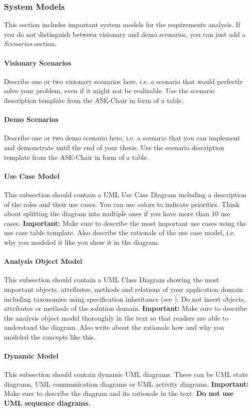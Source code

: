 	\subsubsection{System Models}
		This section includes important system models for the requirements analysis.
		If you do not distinguish between visionary and demo scenarios, you can just add a \textit{Scenarios} section.
		\paragraph{Visionary Scenarios}
			Describe one or two visionary scenarios here, i.e. a scenario that would perfectly solve your problem, even if it might not be realizable.
			Use the scenario description template from the ASE-Chair in form of a table.
		\paragraph{Demo Scenarios}
			Describe one or two demo scenario here, i.e. a scenario that you can implement and demonstrate until the end of your thesis.
			Use the scenario description template from the ASE-Chair in form of a table.
		\paragraph{Use Case Model}
			This subsection should contain a UML Use Case Diagram including a description of the roles and their use cases.
			You can use colors to indicate priorities.
			Think about splitting the diagram into multiple ones if you have more than 10 use cases.
			\textbf{Important:} Make sure to describe the most important use cases using the use case table template.
			Also describe the rationale of the use case model, i.e. why you modeled it like you show it in the diagram.
		\paragraph{Analysis Object Model}
			This subsection should contain a UML Class Diagram showing the most important objects, attributes, methods and relations of your application domain including taxonomies using specification inheritance (see \cite{bruegge2009object}).
			Do not insert objects, attributes or methods of the solution domain.
			\textbf{Important:} Make sure to describe the analysis object model thoroughly in the text so that readers are able to understand the diagram.
			Also write about the rationale how and why you modeled the concepts like this.
		\paragraph{Dynamic Model}
			This subsection should contain dynamic UML diagrams.
			These can be UML state diagrams, UML communication diagrams or UML activity diagrams.
			\textbf{Important:} Make sure to describe the diagram and its rationale in the text.
			\textbf{Do not use UML sequence diagrams.}
